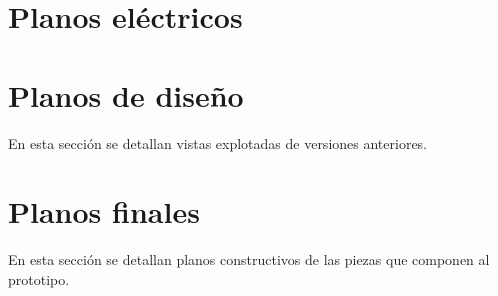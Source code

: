\section{Planos eléctricos}

\section{Planos de diseño}
En esta sección se detallan vistas explotadas de versiones anteriores.






\section{Planos finales}
En esta sección se detallan planos constructivos de las piezas que componen al prototipo.



















% 

